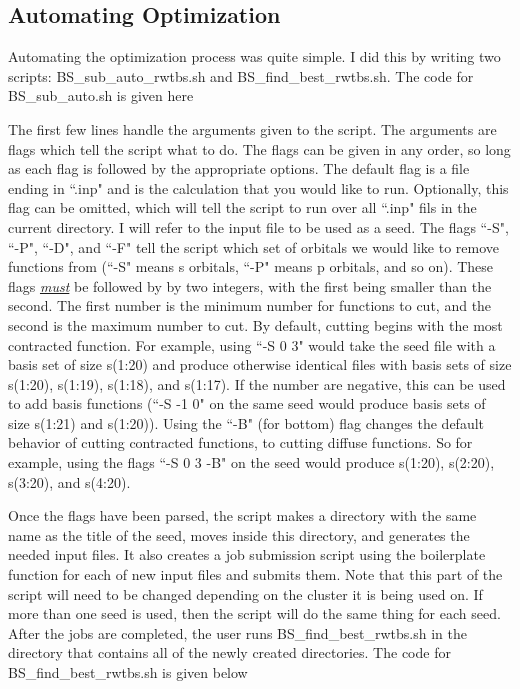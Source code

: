 \subsection{Automating Optimization}
Automating the optimization process was quite simple. I did this by writing two scripts: BS\_sub\_auto\_rwtbs.sh and BS\_find\_best\_rwtbs.sh. The code for BS\_sub\_auto.sh is given here



The first few lines handle the arguments given to the script. The arguments are flags which tell the script what to do. The flags can be given in any order, so long as each flag is followed by the appropriate options. The default flag is a file ending in ``.inp" and is the calculation that you would like to run. Optionally, this flag can be omitted, which will tell the script to run over all ``.inp" fils in the current directory. I will refer to the input file to be used as a seed. The flags ``-S", ``-P", ``-D", and ``-F" tell the script which set of orbitals we would like to remove functions from (``-S" means s orbitals, ``-P" means p orbitals, and so on). These flags \textit{\underline{must}} be followed by by two integers, with the first being smaller than the second. The first number is the minimum number for functions to cut, and the second is the maximum number to cut. By default, cutting begins with the most contracted function. For example, using ``-S 0 3" would take the seed file with a basis set of size s(1:20) and produce otherwise identical files with basis sets of size s(1:20), s(1:19), s(1:18), and s(1:17). If the number are negative, this can be used to add basis functions (``-S -1 0" on the same seed would produce basis sets of size s(1:21) and s(1:20)). Using the ``-B" (for bottom) flag changes the default behavior of cutting contracted functions, to cutting diffuse functions. So for example, using the flags ``-S 0 3 -B" on the seed would produce s(1:20), s(2:20), s(3:20), and s(4:20).

Once the flags have been parsed, the script makes a directory with the same name as the title of the seed, moves inside this directory, and generates the needed input files. It also creates a job submission script using the boilerplate function for each of new input files and submits them. Note that this part of the script will need to be changed depending on the cluster it is being used on. If more than one seed is used, then the script will do the same thing for each seed. After the jobs are completed, the user runs BS\_find\_best\_rwtbs.sh in the directory that contains all of the newly created directories. The code for BS\_find\_best\_rwtbs.sh is given below

